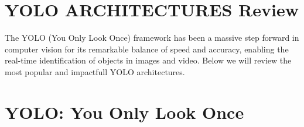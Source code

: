 \documentclass{article}
\begin{document}


\section{YOLO ARCHITECTURES Review}

The YOLO (You Only Look Once) framework has been a massive step forward in computer vision for its remarkable balance of speed and accuracy, enabling the real-time identification of objects in images and video. Below we will review the most popular and impactfull YOLO architectures.




\section{YOLO: You Only Look Once}

\end{document}
